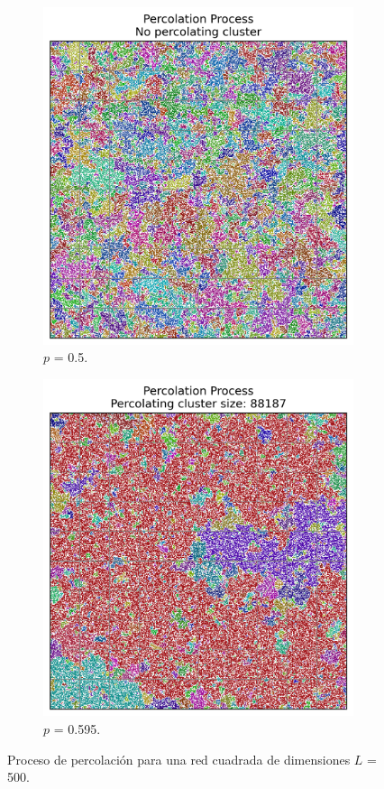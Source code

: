 \documentclass[12pt,a4paper]{article}
\begin{document}
\begin{figure}[H]
    \centering
    \begin{subfigure}[h]{0.45\textwidth}
        \centering
        \includegraphics[width=0.9\linewidth]{../figures/clusterpercolation3.png}
        \caption{$p$ = 0.5.}
        \label{fig:3a}
    \end{subfigure}
    \hspace{0.02 cm}
    \begin{subfigure}[h]{0.45\textwidth}
        \centering
        \includegraphics[width=0.9\linewidth]{../figures/clusterpercolation4.png}
        \caption{$p$ = 0.595.}
        \label{fig:3b}
    \end{subfigure}
    \caption{Proceso de percolación para una red cuadrada de dimensiones $L$ = 500.}
    \label{fig:3}
\end{figure}
\end{document}
